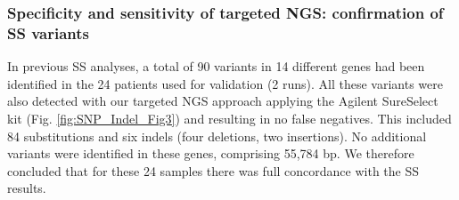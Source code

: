 \begin{table}[!ht] %
	\caption[Overview of the sequence performance for the validation runs]{\label{table:SNP_Indel_performance} Overview of the sequence performance for the validation runs}
	\tiny
\end{table}


\subsubsection{Specificity and sensitivity of targeted NGS: confirmation of SS variants}
In previous SS analyses, a total of 90 variants in 14 different genes had been identified in the 24 patients used for validation (2 runs). 
All these variants were also detected with our targeted NGS approach applying the Agilent SureSelect kit (Fig. \ref{fig:SNP_Indel_Fig3}) and resulting in no false negatives. 
This included 84 substitutions and six indels (four deletions, two insertions). 
No additional variants were identified in these genes, comprising 55,784 bp. 
We therefore concluded that for these 24 samples there was full concordance with the SS results.

